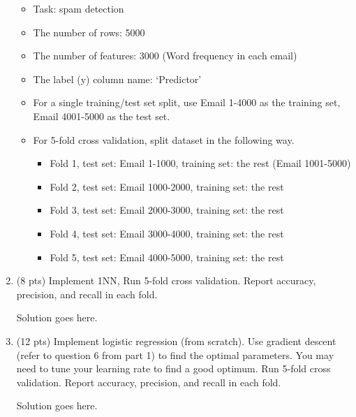 \documentclass[a4paper]{article}
\theoremstyle{definition}
\newenvironment{soln}{
    \leavevmode\color{blue}\ignorespaces
}{}
\begin{document}
\begin{enumerate}
	\begin{itemize}
		\item Task: spam detection
		\item The number of rows: 5000
		\item The number of features: 3000 (Word frequency in each email)
		\item The label (y) column name: `Predictor'
		\item For a single training/test set split, use Email 1-4000 as the training set, Email 4001-5000 as the test set.
		\item For 5-fold cross validation, split dataset in the following way.
		\begin{itemize}
			\item Fold 1, test set: Email 1-1000, training set: the rest (Email 1001-5000)
			\item Fold 2, test set: Email 1000-2000, training set: the rest
			\item Fold 3, test set: Email 2000-3000, training set: the rest
			\item Fold 4, test set: Email 3000-4000, training set: the rest
			\item Fold 5, test set: Email 4000-5000, training set: the rest			
		\end{itemize}
	\end{itemize}
	
	\item (8 pts) Implement 1NN, Run 5-fold cross validation. Report accuracy, precision, and recall in each fold.
	
	\begin{soln}  Solution goes here. \end{soln}
	
	\item (12 pts) Implement logistic regression (from scratch). Use gradient descent (refer to question 6 from part 1) to find the optimal parameters. You may need to tune your learning rate to find a good optimum. Run 5-fold cross validation. Report accuracy, precision, and recall in each fold.
	
	\begin{soln}  Solution goes here. \end{soln}
	

\end{enumerate}
\end{document}
